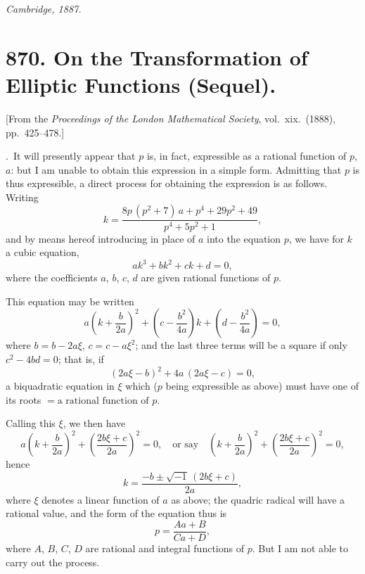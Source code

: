 \documentclass[11pt,a4paper]{book}
\begin{document}
\begin{flushright}
\textit{Cambridge, 1887.}
\end{flushright}
\clearpage


\thispagestyle{empty}

\newpage

\section[870]{870. On the Transformation of Elliptic Functions (Sequel).}
\label{sec:870}

[From the \textit{Proceedings of the London Mathematical Society}, vol.\ xix.\ (1888), pp.\ 425--478.]

\bigskip{}.\ It will presently appear that $p$ is, in fact, expressible as a rational function of $p$, $a$: but I am unable to obtain this expression in a simple form. Admitting that $p$ is thus expressible, a direct process for obtaining the expression is as follows. Writing
\[
k = \frac{8p\,(p^{2}+7)\,a + p^{4} + 29p^{2} + 49}{p^{4}+5p^{2}+1},
\]
and by means hereof introducing in place of $a$ into the equation $p$, we have for $k$ a cubic equation,
\[
ak^{3} + bk^{2} + ck + d = 0,
\]
where the coefficients $a$, $b$, $c$, $d$ are given rational functions of $p$.

This equation may be written
\[
a\left(k + \frac{b}{2a}\right)^{2} + \left(c - \frac{b^{2}}{4a}\right)k + \left(d - \frac{b^{2}}{4a}\right) = 0,
\]
where $b = b - 2a\xi$, $c = c - a\xi^{2}$; and the last three terms will be a square if only $c^{2} - 4bd = 0$; that is, if
\[
(2a\xi - b)^{2} + 4a\,(2a\xi - c) = 0,
\]
a biquadratic equation in $\xi$ which ($p$ being expressible as above) must have one of its roots $= \text{a rational function of } p$.

Calling this $\xi$, we then have
\[
a\left(k + \frac{b}{2a}\right)^{2} + \left(\frac{2b\xi + c}{2a}\right)^{2} = 0, \quad \text{or say}\quad
\left(k + \frac{b}{2a}\right)^{2} + \left(\frac{2b\xi + c}{2a}\right)^{2} = 0,
\]
hence
\[
k = \frac{-b \pm \sqrt{-1}\,(2b\xi + c)}{2a},
\]
where $\xi$ denotes a linear function of $a$ as above; the quadric radical will have a rational value, and the form of the equation thus is
\[
p = \frac{Aa + B}{Ca + D},
\]
where $A$, $B$, $C$, $D$ are rational and integral functions of $p$. But I am not able to carry out the process.
\end{document}
